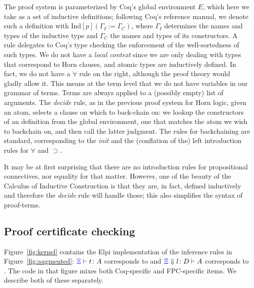 The proof system is parameterized by Coq's global environment $E$,
which here we take as a set of inductive definitions; following Coq's
reference manual, we denote such a definition with
$\mathrm{Ind}[p] (\Gamma_I := \Gamma_C)$, where $\Gamma_I$ determines
the names and types of the inductive type and $\Gamma_C$ the names
and types of its constructors. A rule delegates to Coq's
type checking the enforcement of the well-sortedness of such types. We
do not have a \emph{local context} since we are only dealing with
types that correspond to Horn clauses, and atomic types are
inductively defined. In fact, we do not have a $\forall$ rule on the
right, although the proof theory would gladly allow it. This means at
the term level that we do not have variables in our grammar of
terms. Terms are always applied to a (possibly empty) list of
arguments.  The \emph{decide} rule, %
as in the previous proof system for Horn logic,  given an atom,
 selects a clause on which to back-chain on: we lookup the
constructors of an  definition from the global
environment, one that matches the atom we wish to backchain on, and then
call the latter judgment. The rules for backchaining are standard,
corresponding to the \emph{init} and the (conflation of the) left introduction rules for
$\forall$ and $\supset$.

It may be at first surprising that there are no
introduction rules for propositional connectives, nor equality for
that matter. However, one of the beauty of the Calculus of Inductive
Construction is that they are, in fact,  defined inductively and
therefore the \emph{decide} rule will handle those; this also
simplifies the syntax of proof-terms.

\subsection{Proof certificate checking}
\label{ssec:cert}
Figure~\ref{fig:kernel} contains the Elpi implementation of the
inference rules in Figure~\ref{fig:augmented}: ${\color{blue}{\Xi}}\vdash t \colon A$ corresponds to
 and ${\color{blue}{\Xi}} \Downarrow  l \colon D\vdash A$ corresponds to
.
%
The code in that figure mixes both Coq-specific and
FPC-specific items.  We describe both of these separately.

